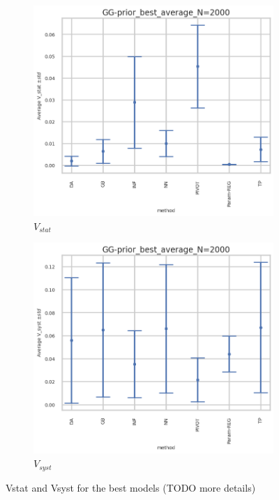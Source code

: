 \begin{figure}[ht!]
  \centering
  \begin{subfigure}[t]{0.49\linewidth}
    \includegraphics[width=\linewidth]{COMPARE/GG-prior/BEST_MSE/GG-prior_best_average_N=2000-errplot_v_stat.png}
    \caption{$V_{stat}$}
  \end{subfigure}%
  \hfill
  \begin{subfigure}[t]{0.49\linewidth}
    \includegraphics[width=\linewidth]{COMPARE/GG-prior/BEST_MSE/GG-prior_best_average_N=2000-errplot_v_syst.png}
    \caption{$V_{syst}$}
  \end{subfigure}
  \caption{Vstat and Vsyst for the best models (TODO more details)}
  \label{fig:compare_gg_prior_best_mse_v_stat_syst}
\end{figure}
